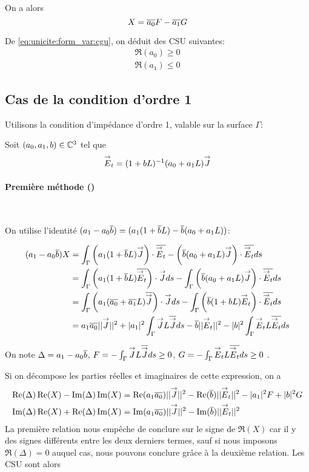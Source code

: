     On a alors
    \begin{equation*}
      X = {\overline{a_0}}F - {\overline{a_1}}G
    \end{equation*}

    De \eqref{eq:unicite:form_var:cgu}, on déduit des CSU suivantes:
    \begin{align}
      \Re\left(a_0\right) \ge 0\\
      \Re\left(a_1\right) \le 0
    \end{align}
  \subsection{Cas de la condition d'ordre 1}

    Utilisons la condition d’impédance d'ordre 1, valable sur la surface \(\Gamma\):

    Soit \((a_0, a_1,b) \in \mathbb C^3\) tel que
    \[
      {\overset{\rightarrow}{E}}_t = (1 + b L)^{-1} (a_0 + a_1 L) {\overset{\rightarrow}{J}}
    \]

    \paragraph{Première méthode (\cite{stupfel_sufficient_2011})}~

      On utilise l'identité \((a_1-a_0{\overline{b}}) = (a_1(1+{\overline{b}}L) - {\overline{b}}(a_0+a_1L))\):

      \begin{align*}
        (a_1-a_0{\overline{b}})X &= \int_\Gamma \left(a_1(1+{\overline{b}}L) {\overset{\rightarrow}{J}}\right)\cdot{\overline{{\overset{\rightarrow}{E}}_t}} - \left({\overline{b}}(a_0+a_1L){\overset{\rightarrow}{J}}\right)\cdot{\overline{{\overset{\rightarrow}{E}}_t}} ds\\
        &= \int_\Gamma \left(a_1(1+{\overline{b}}L) {\overline{{\overset{\rightarrow}{E}}_t}}\right)\cdot{\overset{\rightarrow}{J}} ds - \int_\Gamma \left({\overline{b}}(a_0+a_1L){\overset{\rightarrow}{J}}\right)\cdot{\overline{{\overset{\rightarrow}{E}}_t}} ds\\
        &= \int_\Gamma \left(a_1({\overline{a_0}}+{\overline{a_1}}L) {\overline{{\overset{\rightarrow}{J}}}}\right)\cdot{\overset{\rightarrow}{J}} ds  - \int_\Gamma \left({\overline{b}}(1+bL){\overset{\rightarrow}{E}}_t\right)\cdot{\overline{{\overset{\rightarrow}{E}}_t}} ds\\
        &= a_1{\overline{a_0}} ||{\overset{\rightarrow}{J}}||^2 + |a_1|^2 \int_\Gamma {\overset{\rightarrow}{J}} L {\overline{{\overset{\rightarrow}{J}}}} ds - {\overline{b}} ||{\overset{\rightarrow}{E}}_t||^2 - |b|^2 \int_\Gamma {\overset{\rightarrow}{E}}_t L {\overline{{\overset{\rightarrow}{E}}_t}} ds
      \end{align*}

      On note \(\Delta = a_1 -a_0{\overline{b}}\), \(F = -\int_\Gamma {\overset{\rightarrow}{J}} L {\overline{{\overset{\rightarrow}{J}}}} ds \ge 0 \), \(G = -\int_\Gamma {\overset{\rightarrow}{E}}_t L {\overline{{\overset{\rightarrow}{E}}_t}} ds \ge 0 \) .

      Si on décompose les parties réelles et imaginaires de cette expression, on a
      \begin{align*}
        \operatorname{Re}(\Delta)\operatorname{Re}(X) - \operatorname{Im}(\Delta)\operatorname{Im}(X) &= \operatorname{Re}(a_1{\overline{a_0}}) ||{\overset{\rightarrow}{J}}||^2 - \operatorname{Re}({\overline{b}})||{\overset{\rightarrow}{E}}_t||^2 -|a_1|^2 F + |b|^2 G \\
        \operatorname{Im}(\Delta)\operatorname{Re}(X) + \operatorname{Re}(\Delta)\operatorname{Im}(X) &= \operatorname{Im}(a_1{\overline{a_0}}) ||{\overset{\rightarrow}{J}}||^2 - \operatorname{Im}({\overline{b}})||{\overset{\rightarrow}{E}}_t||^2
      \end{align*}
      La première relation nous empêche de conclure sur le signe de \(\Re(X)\) car il y des signes différents entre les deux derniers termes, sauf si nous imposons \(\Re( \Delta)= 0\) auquel cas, nous pouvons conclure grâce à la deuxième relation. Les CSU sont alors

